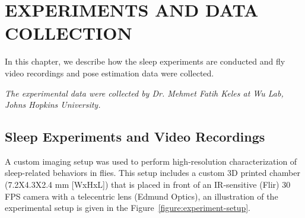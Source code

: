\setlength{\parindent}{0pt}
\chapter{\bf EXPERIMENTS AND DATA COLLECTION}\label{chapter:expt-data-collection}
In this chapter, we describe how the sleep experiments are conducted and fly video recordings and pose estimation data were collected.

\textit{The experimental data were collected by Dr. Mehmet Fatih Keles at Wu Lab, Johns Hopkins University.}

\section{Sleep Experiments and Video Recordings}
A custom imaging setup was used to perform high-resolution characterization of sleep-related behaviors in flies.
This setup includes a custom 3D printed chamber (7.2X4.3X2.4 mm [WxHxL]) that is placed in front of an IR-sensitive (Flir) 30 FPS camera with a telecentric lens (Edmund Optics), an illustration of the experimental setup is given in the Figure~\ref{figure:experiment-setup}.

